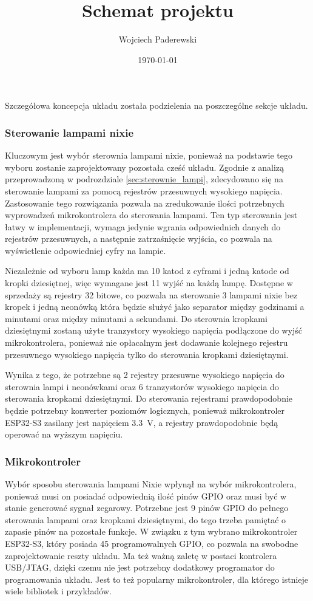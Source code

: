 \documentclass[../main.tex]{subfiles}
\author{Wojciech Paderewski}
\date{\today}
\title{Schemat projektu}
\begin{document}
Szczegółowa koncepcja układu została podzielenia na poszczególne sekcje układu.

\subsubsection{Sterowanie lampami nixie}
Kluczowym jest wybór sterownia lampami nixie, ponieważ na podstawie tego wyboru zostanie zaprojektowany pozostała cześć układu.
Zgodnie z analizą przeprowadzoną w podrozdziale \ref{sec:sterownie_lampi}, zdecydowano się na sterowanie lampami za pomocą rejestrów przesuwnych wysokiego napięcia.
Zastosowanie tego rozwiązania pozwala na zredukowanie ilości potrzebnych wyprowadzeń mikrokontrolera do sterowania lampami. Ten typ sterowania jest łatwy w implementacji,
wymaga jedynie wgrania odpowiednich danych do rejestrów przesuwnych, a następnie zatrzaśnięcie
 wyjścia, co pozwala na wyświetlenie odpowiedniej cyfry na lampie.

Niezależnie od wyboru lamp każda ma 10 katod z cyframi i jedną katode od kropki dziesiętnej, więc wymagane jest 11 wyjść na każdą lampę.
Dostępne w sprzedaży są rejestry 32 bitowe, co pozwala na sterowanie 3 lampami nixie bez kropek i jedną neonówką która będzie
służyć jako separator między godzinami a minutami oraz między minutami a sekundami. Do sterownia kropkami dziesiętnymi zostaną użyte tranzystory wysokiego napięcia podłączone do wyjść mikrokontrolera,
ponieważ nie opłacalnym jest dodawanie kolejnego rejestru przesuwnego wysokiego napięcia tylko do sterowania kropkami dziesiętnymi.

Wynika z tego, że potrzebne są 2 rejestry przesuwne wysokiego napięcia do sterownia lampi i neonówkami oraz 6 tranzystorów wysokiego napięcia do sterowania kropkami dziesiętnymi.
Do sterowania rejestrami prawdopodobnie będzie potrzebny konwerter poziomów logicznych, ponieważ mikrokontroler ESP32-S3 zasilany jest napięciem \SI{3.3}{\volt}, a rejestry prawdopodobnie będą operować na wyższym napięciu.
\subsubsection{Mikrokontroler}
Wybór sposobu sterowania lampami Nixie wpłynął na wybór mikrokontrolera, ponieważ musi on posiadać odpowiednią ilość pinów GPIO oraz musi być w stanie generować sygnał zegarowy.
Potrzebne jest 9 pinów GPIO do pełnego sterowania lampami oraz kropkami dziesiętnymi, do tego trzeba pamiętać o zapasie pinów na pozostałe funkcje. W związku z tym
wybrano mikrokontroler ESP32-S3, który posiada 45 programowalnych GPIO, co pozwala na swobodne zaprojektowanie reszty układu. Ma też ważną zaletę w postaci kontrolera USB/JTAG,
dzięki czemu nie jest potrzebny dodatkowy programator do programowania układu. Jest to też popularny mikrokontroler, dla którego istnieje wiele bibliotek i przykładów.
\end{document}
